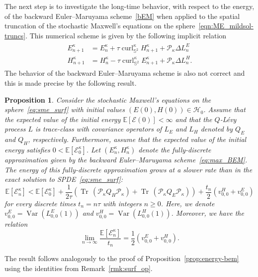 \documentclass[11pt]{amsart}
\newtheorem{proposition}[theorem]{Proposition}
\newcommand{\E}{{\mathbb E}}
\newcommand{\IS}{\mathbb{S}}
\newcommand{\tr}{{\operatorname{Tr}\, }}
\newcommand{\cE}{\mathcal E}
\DeclareMathOperator{\Var}{Var}
\newcommand{\cP}{\mathcal{P}}
\begin{document}
The next step is to investigate the long-time behavior, with respect to the energy, of the backward Euler--Maruyama scheme~\eqref{bEM} when applied to the spatial truncation of the stochastic Maxwell's equations on the sphere~\eqref{eqn:ME_mildsol-truncs}. This numerical scheme is given by the following implicit relation
\begin{align}\label{eq:max_BEM}
	\begin{split}
		E^\kappa_{n+1}&=E^\kappa_{n}+\tau\operatorname{curl}^\kappa_{\IS^2}H^\kappa_{n+1}+\cP_\kappa \Delta L^E_n\\
		H^\kappa_{n+1}&=H^\kappa_{n}-\tau\operatorname{curl}^\kappa_{\IS^2}E^\kappa_{n+1}+\cP_\kappa \Delta L^H_n.
	\end{split}
\end{align}
The behavior of the backward Euler--Maruyama scheme is also not correct and this is made precise by the following result.
\begin{proposition}\label{prop:energy-bem_max}
	Consider the stochastic Maxwell's equations on the sphere~\eqref{eq:sme_surf} with initial values $(E(0),H(0))\in \mathcal H_0$.
	Assume that the expected value of the initial energy $\E\left[\mathcal{E}(0)\right]<\infty$ and that the $Q$-L\'evy process $L$
	is trace-class with covariance operators of $L_E$ and $L_H$ denoted by $Q_E$ and $Q_H$, respectively.
	Furthermore, assume that the expected value of the initial energy satisfies $0<\E\left[\mathcal{E}^\kappa_0\right]$.
	Let $(E_{n}^\kappa, H_{n}^\kappa)$ denote the fully-discrete approximation given by the backward Euler--Maruyama scheme~\eqref{eq:max_BEM}.
	The energy of this fully-discrete approximation grows at a slower rate than in the exact solution to SPDE~\eqref{eq:sme_surf}:
	\begin{equation*}
		\E\left[\cE^\kappa_n\right] <
		\E\left[\cE^\kappa_0\right]+ \frac{1}{2\tau}\left(\tr\left(\cP_\kappa Q_H\cP_\kappa\right)+\tr\left(\cP_\kappa Q_E\cP_\kappa\right)\right) + \frac {t_n} {2} \left(v^H_{0,0}+v^E_{0,0}\right)
	\end{equation*}
	for every discrete times $t_n=n\tau$ with integers $n\geq0$. Here, we denote $v^E_{0,0}=\Var(L^E_{0,0}(1))$ and $v^H_{0,0}=\Var\left(L^H_{0,0}(1)\right)$. Moreover, we have the relation
	\begin{equation}\label{eqn:SME_energy_BEM_limit}
		\lim_{n\to\infty}\frac{\E\left[\mathcal{E}^\kappa_n\right]}{t_n}=\frac 1 2 \left(v^E_{0,0}+v^H_{0,0}\right).
	\end{equation}
\end{proposition}
\begin{appendixproof}
    The result follows analogously to the proof of Proposition~\ref{prop:energy-bem} using the identities from Remark~\ref{rmk:surf_op}.
\end{appendixproof}
\end{document}
